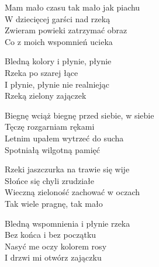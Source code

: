 
\begin{text}
    Mam mało czasu tak mało jak piachu\\
    W dziecięcej garści nad rzeką\\
    Zwieram powieki zatrzymać obraz\\
    Co z moich wspomnień ucieka

    Bledną kolory i płynie, płynie\\
    Rzeka po szarej łące\\
    I płynie, płynie nie realniejąc\\
    Rzeką zielony zajączek

    Biegnę wciąż biegnę przed siebie, w siebie\\
    Tęczę rozgarniam rękami\\
    Letnim upałem wytrzeć do sucha\\
    Spotniałą wilgotną pamięć

    Rzeki jaszczurka na trawie się wije\\
    Słońce się chyli zrudziałe\\
    Wieczną zieloność zachować w oczach\\
    Tak wiele pragnę, tak mało

    Bledną wspomnienia i płynie rzeka\\
    Bez końca i bez początku\\
    Nasyć me oczy kolorem rosy\\
    I drzwi mi otwórz zajączku
\end{text}
\begin{chord}

\end{chord}